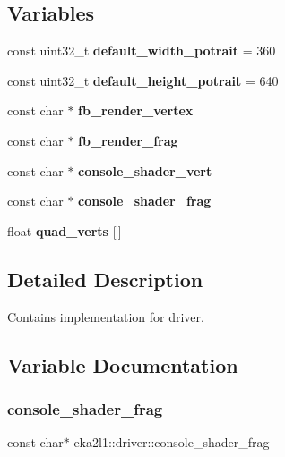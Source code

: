 \subsection*{Variables}
\begin{DoxyCompactItemize}
\item 
\mbox{\label{namespaceeka2l1_1_1driver_a48ecfd2cad1c309096c44fffbd0b970c}} 
const uint32\+\_\+t {\bfseries default\+\_\+width\+\_\+potrait} = 360
\item 
\mbox{\label{namespaceeka2l1_1_1driver_ac124f34d3c09c8768685a09708b84641}} 
const uint32\+\_\+t {\bfseries default\+\_\+height\+\_\+potrait} = 640
\item 
const char $\ast$ {\bfseries fb\+\_\+render\+\_\+vertex}
\item 
const char $\ast$ {\bfseries fb\+\_\+render\+\_\+frag}
\item 
const char $\ast$ {\bfseries console\+\_\+shader\+\_\+vert}
\item 
const char $\ast$ {\bfseries console\+\_\+shader\+\_\+frag}
\item 
float {\bfseries quad\+\_\+verts} \mbox{[}$\,$\mbox{]}
\end{DoxyCompactItemize}


\subsection{Detailed Description}
Contains implementation for driver. 

\subsection{Variable Documentation}
\mbox{\label{namespaceeka2l1_1_1driver_a1c721bd0548124043b6a9e668207641b}} 
\subsubsection{\texorpdfstring{console\+\_\+shader\+\_\+frag}{console\_shader\_frag}}
{\footnotesize\ttfamily const char$\ast$ eka2l1\+::driver\+::console\+\_\+shader\+\_\+frag}

